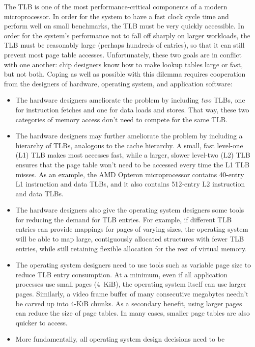 The TLB is one of the most performance-critical components of a modern
microprocessor.  In order for the system to have a fast clock cycle
time and perform well on small benchmarks, the TLB must be very
quickly accessible.  In order for the system's performance not to fall
off sharply on larger workloads, the TLB must be reasonably large
(perhaps hundreds of entries), so that it can still prevent most page
table accesses.  Unfortunately, these two goals are in conflict with
one another: chip designers know how to make lookup tables large or
fast, but not both.  Coping as well as possible with this dilemma
requires cooperation from the designers of hardware, operating system,
and application software:
\begin{itemize}
\item
The hardware designers ameliorate the problem by including
{\em two} TLBs, one for instruction fetches and one for data loads
and stores.  That way, these two categories of memory access don't
need to compete for the same TLB.
\item
The hardware designers may further ameliorate the problem by including
a hierarchy of TLBs, analogous to the cache hierarchy.  A small, fast
level-one (L1) TLB makes most accesses fast, while a larger,
slower level-two (L2) TLB ensures that the page table won't need to be
accessed every time the L1 TLB misses.  As an example, the AMD Opteron
microprocessor contains 40-entry L1 instruction and data TLBs,
and it also contains 512-entry L2 instruction and data TLBs.
\item
The hardware designers also give the operating system designers some
tools for reducing the demand for TLB entries.  For example, if
different TLB entries can provide mappings for pages of varying sizes,
the operating system will be able to map large, contiguously allocated
structures with fewer TLB entries, while still retaining flexible
allocation for the rest of virtual memory.
\item
The operating system designers need to use tools such as variable page
size to reduce TLB entry consumption.  At a minimum, even if all
application processes use small pages (4~KiB), the operating system
itself can use larger pages.  Similarly, a video frame buffer of many
consecutive megabytes needn't be carved up into 4-KiB chunks.  As a
secondary benefit, using larger pages can reduce the size of page tables.
In many cases, smaller page tables are also quicker to access.
\item
More fundamentally, all operating system design decisions need to be

\end{itemize}
